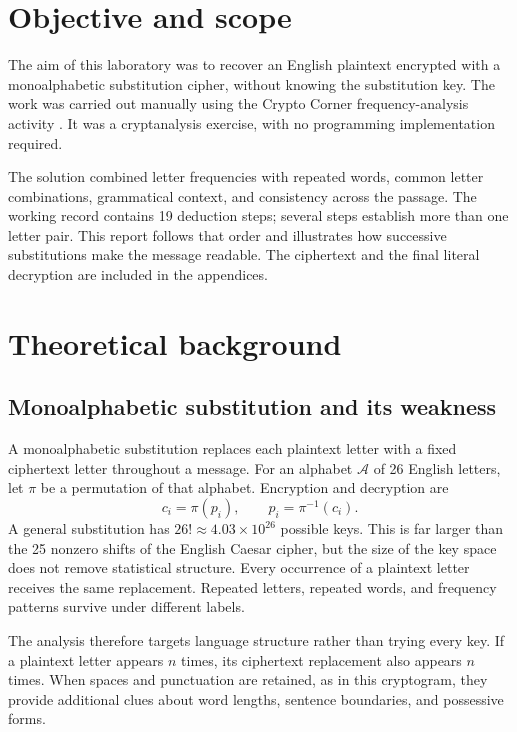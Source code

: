 \section{Objective and scope}
The aim of this laboratory was to recover an English plaintext encrypted with a monoalphabetic substitution cipher, without knowing the substitution key. The work was carried out manually using the Crypto Corner frequency-analysis activity \cite{tool}. It was a cryptanalysis exercise, with no programming implementation required.

The solution combined letter frequencies with repeated words, common letter combinations, grammatical context, and consistency across the passage. The working record contains 19 deduction steps; several steps establish more than one letter pair. This report follows that order and illustrates how successive substitutions make the message readable. The ciphertext and the final literal decryption are included in the appendices.

\section{Theoretical background}
\subsection{Monoalphabetic substitution and its weakness}
A monoalphabetic substitution replaces each plaintext letter with a fixed ciphertext letter throughout a message. For an alphabet $\mathcal{A}$ of 26 English letters, let $\pi$ be a permutation of that alphabet. Encryption and decryption are
\begin{equation}
  c_i=\pi(p_i),\qquad p_i=\pi^{-1}(c_i).
\end{equation}
A general substitution has $26!\approx4.03\times10^{26}$ possible keys. This is far larger than the 25 nonzero shifts of the English Caesar cipher, but the size of the key space does not remove statistical structure. Every occurrence of a plaintext letter receives the same replacement. Repeated letters, repeated words, and frequency patterns survive under different labels.

The analysis therefore targets language structure rather than trying every key. If a plaintext letter appears $n$ times, its ciphertext replacement also appears $n$ times. When spaces and punctuation are retained, as in this cryptogram, they provide additional clues about word lengths, sentence boundaries, and possessive forms.

